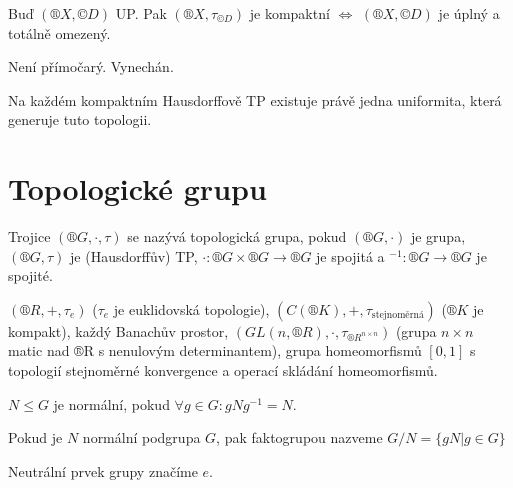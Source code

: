 \documentclass[12pt]{article}					%
\begin{document}
    \begin{veta}
        Buď $(®X, ©D)$ UP. Pak $(®X, \tau_{©D})$ je kompaktní $\Leftrightarrow$ $(®X, ©D)$ je úplný a totálně omezený.

        \begin{dukazin}
            Není přímočarý. Vynechán.
        \end{dukazin}
    \end{veta}

    \begin{veta}
        Na každém kompaktním Hausdorffově TP existuje právě jedna uniformita, která generuje tuto topologii.
    \end{veta}


\section{Topologické grupu}
\begin{definice}
        Trojice $(®G, ·, \tau)$ se nazývá topologická grupa, pokud $(®G, ·)$ je grupa, $(®G, \tau)$ je (Hausdorffův) TP, $·: ®G \times ®G \rightarrow ®G$ je spojitá a $ ^{-1}: ®G \rightarrow ®G$ je spojité.
    \end{definice}

    \begin{priklady}
            $(®R, +, \tau_e)$ ($\tau_e$ je euklidovská topologie), $(C(®K), +, \tau_{\text{stejnoměrná}})$ ($®K$ je kompakt), každý Banachův prostor, $(GL(n, ®R), ·, \tau_{®R^{n \times n}})$ (grupa $n \times n$ matic nad ®R s nenulovým determinantem), grupa homeomorfismů $[0, 1]$ s topologií stejnoměrné konvergence a operací skládání homeomorfismů.
    \end{priklady}

    \begin{poznamka}
        $N ≤ G$ je normální, pokud $\forall g \in G: gNg^{-1} = N$.

        Pokud je $N$ normální podgrupa $G$, pak faktogrupou nazveme $G/N = \{gN | g \in G\}$

        Neutrální prvek grupy značíme $e$.
    \end{poznamka}
\end{document}
